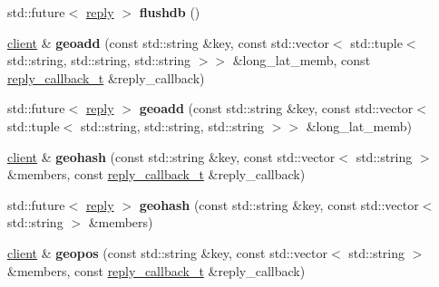 \begin{DoxyCompactItemize}
\item 
\mbox{\label{classcpp__redis_1_1client_acd8cea192338f42f601ea8fce5c8048c}} 
std\+::future$<$ \hyperlink{classcpp__redis_1_1reply}{reply} $>$ {\bfseries flushdb} ()
\item 
\mbox{\label{classcpp__redis_1_1client_acb21c6730ed40799cef06315db231409}} 
\hyperlink{classcpp__redis_1_1client}{client} \& {\bfseries geoadd} (const std\+::string \&key, const std\+::vector$<$ std\+::tuple$<$ std\+::string, std\+::string, std\+::string $>$$>$ \&long\+\_\+lat\+\_\+memb, const \hyperlink{classcpp__redis_1_1client_a061a1140d36d2eaeda82b09a0bb3f9f2}{reply\+\_\+callback\+\_\+t} \&reply\+\_\+callback)
\item 
\mbox{\label{classcpp__redis_1_1client_a6e4bebc3a7935bd749f2b4a6bfbb6c22}} 
std\+::future$<$ \hyperlink{classcpp__redis_1_1reply}{reply} $>$ {\bfseries geoadd} (const std\+::string \&key, const std\+::vector$<$ std\+::tuple$<$ std\+::string, std\+::string, std\+::string $>$$>$ \&long\+\_\+lat\+\_\+memb)
\item 
\mbox{\label{classcpp__redis_1_1client_a37b20a863f276469d12dc47063d56055}} 
\hyperlink{classcpp__redis_1_1client}{client} \& {\bfseries geohash} (const std\+::string \&key, const std\+::vector$<$ std\+::string $>$ \&members, const \hyperlink{classcpp__redis_1_1client_a061a1140d36d2eaeda82b09a0bb3f9f2}{reply\+\_\+callback\+\_\+t} \&reply\+\_\+callback)
\item 
\mbox{\label{classcpp__redis_1_1client_ac421d4e696a67c1295a6b55ceaeab680}} 
std\+::future$<$ \hyperlink{classcpp__redis_1_1reply}{reply} $>$ {\bfseries geohash} (const std\+::string \&key, const std\+::vector$<$ std\+::string $>$ \&members)
\item 
\mbox{\label{classcpp__redis_1_1client_ae4bba1470cf357a8c4d1f8360a9c8b79}} 
\hyperlink{classcpp__redis_1_1client}{client} \& {\bfseries geopos} (const std\+::string \&key, const std\+::vector$<$ std\+::string $>$ \&members, const \hyperlink{classcpp__redis_1_1client_a061a1140d36d2eaeda82b09a0bb3f9f2}{reply\+\_\+callback\+\_\+t} \&reply\+\_\+callback)
\item 

\end{DoxyCompactItemize}
